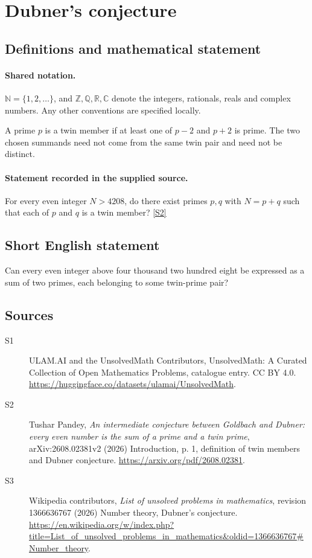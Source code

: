\documentclass[11pt]{article}
\newcommand{\sref}[2]{\hyperlink{source:#1:#2}{[S#2]}}
\begin{document}
\section{Dubner's conjecture}\label{statement}

\subsection{Definitions and mathematical statement}

\paragraph{Shared notation.}$\mathbb N=\{1,2,\ldots\}$, and $\mathbb Z,\mathbb Q,\mathbb R,\mathbb C$ denote the integers, rationals, reals and complex numbers. Any other conventions are specified locally.


A prime $p$ is a twin member if at least one of $p-2$ and $p+2$ is prime. The two chosen summands need not come from the same twin pair and need not be distinct.
\paragraph{Statement recorded in the supplied source.}
For every even integer $N>4208$, do there exist primes $p,q$ with $N=p+q$ such that each of $p$ and $q$ is a twin member? \sref{statement}{2}
\subsection{Short English statement}
Can every even integer above four thousand two hundred eight be expressed as a sum of two primes, each belonging to some twin-prime pair?
\subsection{Sources}
\begin{description}
\item[\hypertarget{source:statement:1}{S1}] ULAM.AI and the UnsolvedMath Contributors, UnsolvedMath: A Curated Collection of Open Mathematics Problems, catalogue entry. CC BY 4.0. \url{https://huggingface.co/datasets/ulamai/UnsolvedMath}.
\item[\hypertarget{source:statement:2}{S2}] Tushar Pandey, \emph{An intermediate conjecture between Goldbach and Dubner: every even number is the sum of a prime and a twin prime}, arXiv:2608.02381v2 (2026) Introduction, p. 1, definition of twin members and Dubner conjecture. \url{https://arxiv.org/pdf/2608.02381}.
\item[\hypertarget{source:statement:3}{S3}] Wikipedia contributors, \emph{List of unsolved problems in mathematics}, revision 1366636767 (2026) Number theory, Dubner's conjecture. \url{https://en.wikipedia.org/w/index.php?title=List_of_unsolved_problems_in_mathematics&oldid=1366636767#Number_theory}.
\end{description}
\label{end:statement}
\end{document}
